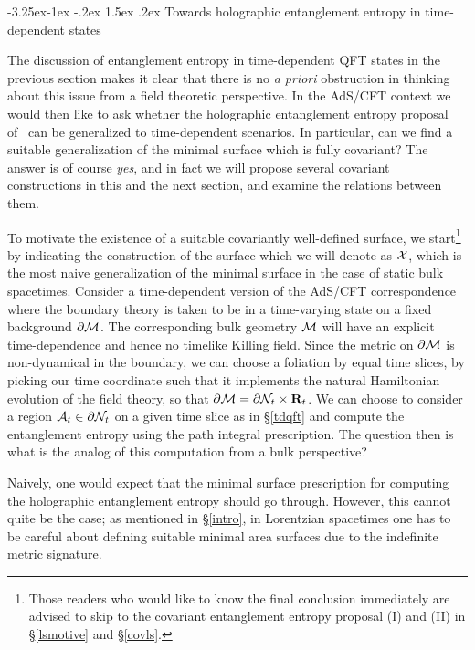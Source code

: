 \documentclass[12pt]{article}
\makeatletter
\renewcommand\subsection{\@startsection{subsection}{2}{\z@}%
                                     {-3.25ex\@plus -1ex \@minus -.2ex}%
                                     {1.5ex \@plus .2ex}%
                                     {\normalfont\bfseries}}
\def\sec#1{\S \;\ref{#1}}
\def\p{\partial}
\def\CA{{\cal A}}
\def\CX{{\cal X}}
\def\R{{\bf R}}
\def\p{\partial}
\def\p{\partial}
\def\bulk{{\cal M}}
\def\bdy{\p{\cal M}}
\def\bdys{\p{\cal N}}
\def\Xms{\CX}
\def\rA{\CA}
\makeatother
\begin{document}
\subsection{Towards holographic entanglement entropy in time-dependent states}
\label{holtimedep}


The discussion of entanglement entropy in time-dependent  QFT states
 in the previous section makes it clear that there is no
  {\it a priori} obstruction in thinking about this issue from a
   field theoretic perspective. In the AdS/CFT context we would then like
    to ask whether the holographic entanglement entropy proposal of~\cite{Ryu:2006bv,Ryu:2006ef}  can be generalized to time-dependent scenarios.  In particular, can we find a suitable generalization of the minimal surface which is fully covariant?  The answer is of course {\it yes}, and
    in fact we will propose several covariant constructions in this and the next section, and
    examine the relations between them.

To motivate the existence of a suitable covariantly well-defined
surface, we start\footnote{Those readers who
 would like to know the final conclusion immediately are advised to skip to the covariant
 entanglement entropy proposal (I) and (II) in
 \sec{lsmotive} and \sec{covls}.}
  by indicating the construction of the surface which we will denote as  $\Xms$,
 which is the most naive generalization of the minimal surface in the case of static bulk spacetimes.
  Consider a time-dependent  version of the AdS/CFT correspondence where the boundary
  theory is taken to be in a time-varying state on a  fixed background $\bdy$. The corresponding
  bulk geometry $\bulk$ will have an explicit time-dependence
   and hence no timelike Killing field. Since the metric on $\bdy$ is non-dynamical in the boundary,
   we can choose a foliation by equal time slices, by picking our time coordinate such that it
   implements the natural Hamiltonian evolution of the field theory, so that
 $\bdy =  \bdys_t \times \R_t$. We can choose to consider a region $\rA_t \in \bdys_t$ on a given
  time slice as in \sec{tdqft}  and compute the entanglement entropy using the path integral prescription.
   The question then is what is the analog of this computation from a bulk perspective?

Naively, one would expect that the minimal surface prescription for computing the
 holographic entanglement entropy should go through. However, this cannot quite be
 the case; as mentioned in \sec{intro}, in Lorentzian spacetimes one has to be careful about defining suitable  minimal area surfaces due to the indefinite metric signature.
\end{document}
